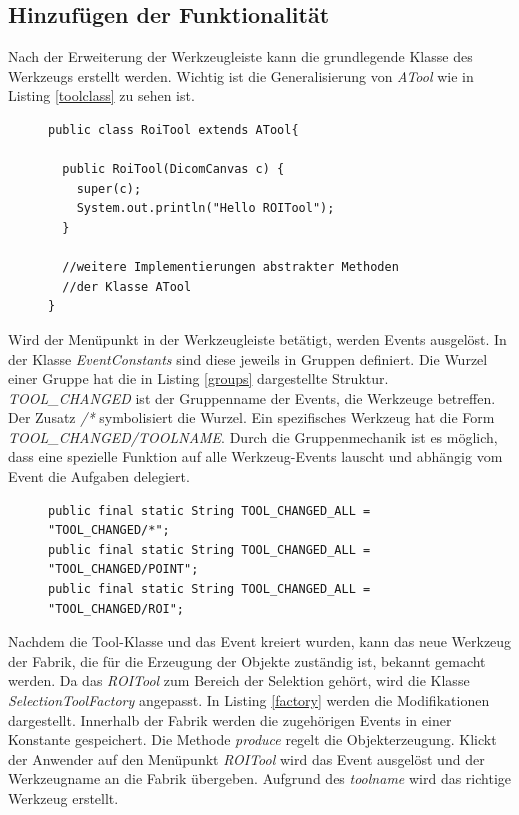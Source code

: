 \subsection{Hinzufügen der Funktionalität}

Nach der Erweiterung der Werkzeugleiste kann die grundlegende Klasse des Werkzeugs erstellt werden. Wichtig ist die Generalisierung von \textit{ATool} wie in Listing \ref{toolclass} zu sehen ist.

\begin{figure}[htbp]
\begin{lstlisting}[frame=leftline]
public class RoiTool extends ATool{

  public RoiTool(DicomCanvas c) {
    super(c);
    System.out.println("Hello ROITool");
  }
  
  //weitere Implementierungen abstrakter Methoden
  //der Klasse ATool
}
\end{lstlisting}
\end{figure}

Wird der Menüpunkt in der Werkzeugleiste betätigt, werden Events ausgelöst. In der Klasse \textit{EventConstants} sind diese jeweils in Gruppen definiert. Die Wurzel einer Gruppe hat die in Listing \ref{groups} dargestellte Struktur. \textit{TOOL\_CHANGED} ist der Gruppenname der Events, die Werkzeuge betreffen. Der Zusatz \textit{/*} symbolisiert die Wurzel. Ein spezifisches Werkzeug hat die Form \textit{TOOL\_CHANGED/TOOLNAME}. Durch die Gruppenmechanik ist es möglich, dass eine spezielle Funktion auf alle Werkzeug-Events lauscht und abhängig vom Event die Aufgaben delegiert.

\begin{figure}[htbp]
\begin{lstlisting}[frame=leftline]
public final static String TOOL_CHANGED_ALL = "TOOL_CHANGED/*";
public final static String TOOL_CHANGED_ALL = "TOOL_CHANGED/POINT";
public final static String TOOL_CHANGED_ALL = "TOOL_CHANGED/ROI";
\end{lstlisting}
\end{figure}

Nachdem die Tool-Klasse und das Event kreiert wurden, kann das neue Werkzeug der Fabrik, die für die Erzeugung der Objekte zuständig ist, bekannt gemacht werden. Da das \textit{ROITool} zum Bereich der Selektion gehört, wird die Klasse \textit{SelectionToolFactory} angepasst. In Listing \ref{factory} werden die Modifikationen dargestellt. Innerhalb der Fabrik werden die zugehörigen Events in einer Konstante gespeichert. Die Methode \textit{produce} regelt die Objekterzeugung. Klickt der Anwender auf den Menüpunkt \textit{ROITool} wird das Event ausgelöst und der Werkzeugname an die Fabrik übergeben. Aufgrund des \textit{toolname} wird das richtige Werkzeug erstellt.

